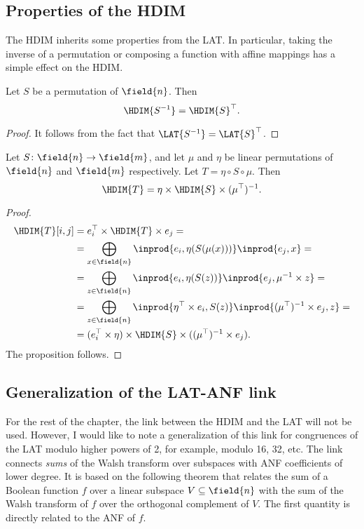 
\subsection{Properties of the HDIM}

The HDIM inherits some properties from the LAT. In particular, taking the inverse of a permutation or composing a function with affine mappings has a simple effect on the HDIM.

\begin{proposition}
Let $S$ be a permutation of $\field{n}$. Then $$\HDIM{S^{-1}} = \HDIM{S}^{\top}.$$
\end{proposition}
\begin{proof}
It follows from the fact that $\LAT{S^{-1}} = \LAT{S}^{\top}$.
\end{proof}

\begin{proposition}
Let $S\colon \field{n} \to \field{m}$, and let $\mu$ and $\eta$ be linear permutations of $\field{n}$ and $\field{m}$ respectively. Let $T=\eta \circ S \circ \mu$. Then
$$
\HDIM{T} = \eta \times \HDIM{S} \times (\mu^{\top})^{-1}.
$$
\end{proposition}
\begin{proof}
\begin{align*}
\HDIM{T}[i,j] & = e_i^{\top} \times \HDIM{T} \times e_j = \\
& = \bigoplus_{x\in \field{n}} \inprod{e_i,\eta(S(\mu(x)))} \inprod{e_j,x} = \\
& = \bigoplus_{z\in \field{n}} \inprod{e_i,\eta(S(z))} \inprod{e_j,\mu^{-1}\times z} = \\
& = \bigoplus_{z\in \field{n}} \inprod{\eta^{\top}\times e_i,S(z)} \inprod{(\mu^{\top})^{-1}\times e_j, z} = \\
& = (e_i^{\top} \times \eta) \times \HDIM{S} \times ((\mu^{\top})^{-1} \times e_j).
\end{align*}
The proposition follows.
\end{proof}


\subsection{Generalization of the LAT-ANF link}

For the rest of the chapter, the link between the HDIM and the LAT will not be used. However, I would like to note a generalization of this link for congruences of the LAT modulo higher powers of 2, for example, modulo 16, 32, etc. The link connects \emph{sums} of the Walsh transform over subspaces with ANF coefficients of lower degree. It is based on the following theorem that relates the sum of a Boolean function $f$ over a linear subspace $V\subseteq\field{n}$ with the sum of the Walsh transform of $f$ over the orthogonal complement of $V$. The first quantity is directly related to the ANF of $f$.

